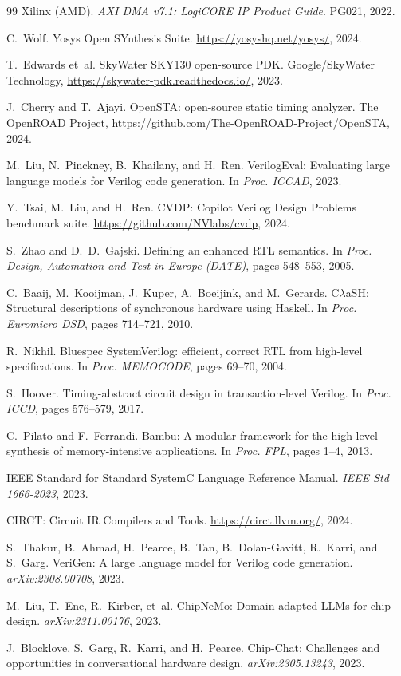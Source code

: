 \documentclass[11pt,twocolumn]{article}
\begin{document}
\begin{thebibliography}{99}
Xilinx (AMD).
\textit{AXI DMA v7.1: LogiCORE IP Product Guide}.
PG021, 2022.

C.~Wolf.
Yosys Open SYnthesis Suite.
\url{https://yosyshq.net/yosys/}, 2024.

T.~Edwards et~al.
SkyWater SKY130 open-source PDK.
Google/SkyWater Technology, \url{https://skywater-pdk.readthedocs.io/}, 2023.

J.~Cherry and T.~Ajayi.
OpenSTA: open-source static timing analyzer.
The OpenROAD Project, \url{https://github.com/The-OpenROAD-Project/OpenSTA}, 2024.

M.~Liu, N.~Pinckney, B.~Khailany, and H.~Ren.
VerilogEval: Evaluating large language models for Verilog code generation.
In \textit{Proc. ICCAD}, 2023.

Y.~Tsai, M.~Liu, and H.~Ren.
CVDP: Copilot Verilog Design Problems benchmark suite.
\url{https://github.com/NVlabs/cvdp}, 2024.

S.~Zhao and D.~D.~Gajski.
Defining an enhanced RTL semantics.
In \textit{Proc. Design, Automation and Test in Europe (DATE)}, pages 548--553, 2005.

C.~Baaij, M.~Kooijman, J.~Kuper, A.~Boeijink, and M.~Gerards.
C$\lambda$aSH: Structural descriptions of synchronous hardware using Haskell.
In \textit{Proc. Euromicro DSD}, pages 714--721, 2010.

R.~Nikhil.
Bluespec SystemVerilog: efficient, correct RTL from high-level specifications.
In \textit{Proc. MEMOCODE}, pages 69--70, 2004.

S.~Hoover.
Timing-abstract circuit design in transaction-level Verilog.
In \textit{Proc. ICCD}, pages 576--579, 2017.

C.~Pilato and F.~Ferrandi.
Bambu: A modular framework for the high level synthesis of memory-intensive applications.
In \textit{Proc. FPL}, pages 1--4, 2013.

IEEE Standard for Standard SystemC Language Reference Manual.
\textit{IEEE Std 1666-2023}, 2023.

CIRCT: Circuit IR Compilers and Tools.
\url{https://circt.llvm.org/}, 2024.

S.~Thakur, B.~Ahmad, H.~Pearce, B.~Tan, B.~Dolan-Gavitt, R.~Karri, and S.~Garg.
VeriGen: A large language model for Verilog code generation.
\textit{arXiv:2308.00708}, 2023.

M.~Liu, T.~Ene, R.~Kirber, et~al.
ChipNeMo: Domain-adapted LLMs for chip design.
\textit{arXiv:2311.00176}, 2023.

J.~Blocklove, S.~Garg, R.~Karri, and H.~Pearce.
Chip-Chat: Challenges and opportunities in conversational hardware design.
\textit{arXiv:2305.13243}, 2023.

\end{thebibliography}
\end{document}
